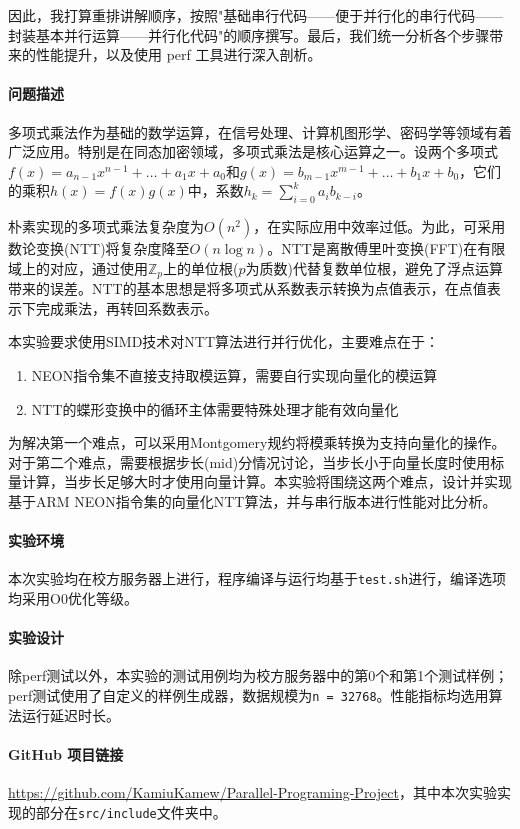 \documentclass[a4paper]{article}
\begin{document}
因此，我打算重排讲解顺序，按照"基础串行代码——便于并行化的串行代码——封装基本并行运算——并行化代码"的顺序撰写。最后，我们统一分析各个步骤带来的性能提升，以及使用 perf 工具进行深入剖析。

\paragraph{问题描述} 多项式乘法作为基础的数学运算，在信号处理、计算机图形学、密码学等领域有着广泛应用。特别是在同态加密领域，多项式乘法是核心运算之一。设两个多项式$f(x) = a_{n-1}x^{n-1} + \ldots + a_1x + a_0$和$g(x) = b_{m-1}x^{m-1} + \ldots + b_1x + b_0$，它们的乘积$h(x) = f(x)g(x)$中，系数$h_k = \sum_{i=0}^{k} a_i b_{k-i}$。

朴素实现的多项式乘法复杂度为$O(n^2)$，在实际应用中效率过低。为此，可采用数论变换(NTT)将复杂度降至$O(n\log n)$。NTT是离散傅里叶变换(FFT)在有限域上的对应，通过使用$\mathbb{Z}_p$上的单位根($p$为质数)代替复数单位根，避免了浮点运算带来的误差。NTT的基本思想是将多项式从系数表示转换为点值表示，在点值表示下完成乘法，再转回系数表示。

本实验要求使用SIMD技术对NTT算法进行并行优化，主要难点在于：
\begin{enumerate}
    \item NEON指令集不直接支持取模运算，需要自行实现向量化的模运算
    \item NTT的蝶形变换中的循环主体需要特殊处理才能有效向量化
\end{enumerate}

为解决第一个难点，可以采用Montgomery规约将模乘转换为支持向量化的操作。对于第二个难点，需要根据步长(mid)分情况讨论，当步长小于向量长度时使用标量计算，当步长足够大时才使用向量计算。本实验将围绕这两个难点，设计并实现基于ARM NEON指令集的向量化NTT算法，并与串行版本进行性能对比分析。

\paragraph{实验环境} 本次实验均在校方服务器上进行，程序编译与运行均基于\texttt{test.sh}进行，编译选项均采用O0优化等级。

\paragraph{实验设计} 除perf测试以外，本实验的测试用例均为校方服务器中的第0个和第1个测试样例；perf测试使用了自定义的样例生成器，数据规模为\texttt{n = 32768}。性能指标均选用算法运行延迟时长。

\paragraph{GitHub 项目链接} \url{https://github.com/KamiuKamew/Parallel-Programing-Project}，其中本次实验实现的部分在\texttt{src/include}文件夹中。
\end{document}
